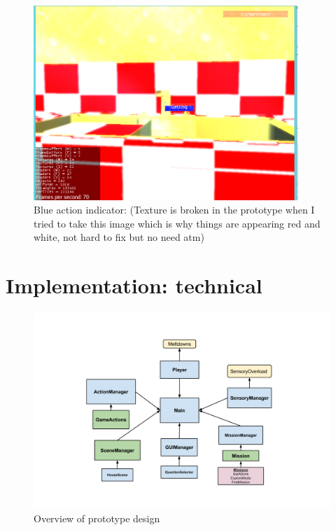 \documentclass[11pt]{report}
\begin{document}
\begin{figure}[H]
\centering
\includegraphics[width=100mm]{images/prototype/actionindicator.png}
\caption{Blue action indicator: (Texture is broken in the prototype when I tried to take this image which is why things are appearing red and white, not hard to fix but no need atm)}
\label{prototype_actionindicator}
\end{figure}

\section{Implementation: technical}

\begin{figure}[H]
\centering
\includegraphics[scale=0.6]{images/prototype/prototypeoverview.png}
\caption{Overview of prototype design}
\label{protooverview}
\end{figure}
\end{document}
